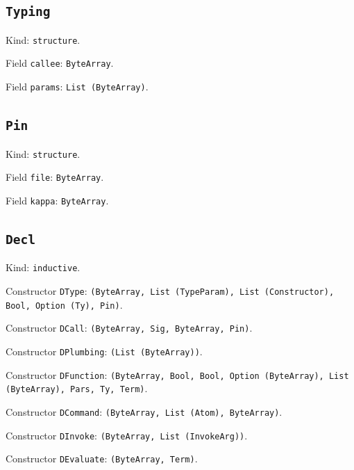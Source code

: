 \documentclass[11pt]{article}
\begin{document}
\subsection*{\texttt{Typing}}
\noindent Kind: \texttt{structure}.\par
\noindent Field \texttt{callee}: \texttt{ByteArray}.\par
\noindent Field \texttt{params}: \texttt{List (ByteArray)}.\par
\subsection*{\texttt{Pin}}
\noindent Kind: \texttt{structure}.\par
\noindent Field \texttt{file}: \texttt{ByteArray}.\par
\noindent Field \texttt{kappa}: \texttt{ByteArray}.\par
\subsection*{\texttt{Decl}}
\noindent Kind: \texttt{inductive}.\par
\noindent Constructor \texttt{DType}: \texttt{(ByteArray, List (TypeParam), List (Constructor), Bool, Option (Ty), Pin)}.\par
\noindent Constructor \texttt{DCall}: \texttt{(ByteArray, Sig, ByteArray, Pin)}.\par
\noindent Constructor \texttt{DPlumbing}: \texttt{(List (ByteArray))}.\par
\noindent Constructor \texttt{DFunction}: \texttt{(ByteArray, Bool, Bool, Option (ByteArray), List (ByteArray), Pars, Ty, Term)}.\par
\noindent Constructor \texttt{DCommand}: \texttt{(ByteArray, List (Atom), ByteArray)}.\par
\noindent Constructor \texttt{DInvoke}: \texttt{(ByteArray, List (InvokeArg))}.\par
\noindent Constructor \texttt{DEvaluate}: \texttt{(ByteArray, Term)}.\par
\end{document}
